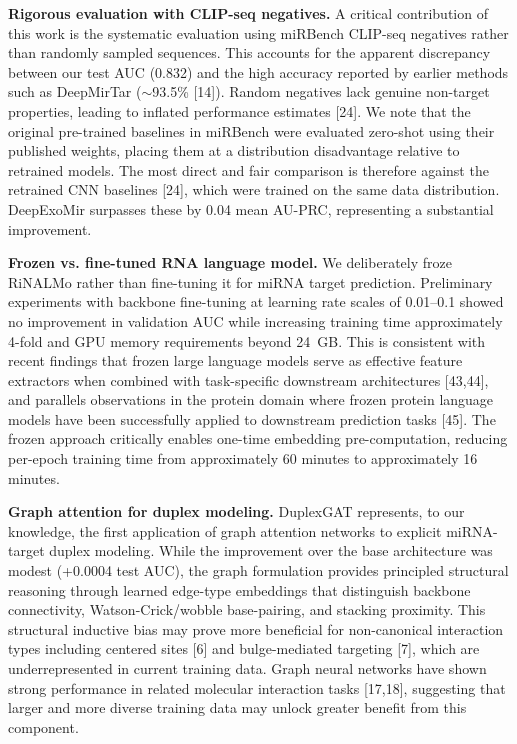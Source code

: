 \documentclass[sn-mathphys-num]{sn-jnl}
\begin{document}
\textbf{Rigorous evaluation with CLIP-seq negatives.} A critical contribution of this work is the systematic evaluation using miRBench CLIP-seq negatives rather than randomly sampled sequences. This accounts for the apparent discrepancy between our test AUC (0.832) and the high accuracy reported by earlier methods such as DeepMirTar ($\sim$93.5\% [14]). Random negatives lack genuine non-target properties, leading to inflated performance estimates [24]. We note that the original pre-trained baselines in miRBench were evaluated zero-shot using their published weights, placing them at a distribution disadvantage relative to retrained models. The most direct and fair comparison is therefore against the retrained CNN baselines [24], which were trained on the same data distribution. DeepExoMir surpasses these by 0.04 mean AU-PRC, representing a substantial improvement.

\textbf{Frozen vs. fine-tuned RNA language model.} We deliberately froze RiNALMo rather than fine-tuning it for miRNA target prediction. Preliminary experiments with backbone fine-tuning at learning rate scales of 0.01--0.1 showed no improvement in validation AUC while increasing training time approximately 4-fold and GPU memory requirements beyond 24~GB. This is consistent with recent findings that frozen large language models serve as effective feature extractors when combined with task-specific downstream architectures [43,44], and parallels observations in the protein domain where frozen protein language models have been successfully applied to downstream prediction tasks [45]. The frozen approach critically enables one-time embedding pre-computation, reducing per-epoch training time from approximately 60 minutes to approximately 16 minutes.

\textbf{Graph attention for duplex modeling.} DuplexGAT represents, to our knowledge, the first application of graph attention networks to explicit miRNA-target duplex modeling. While the improvement over the base architecture was modest (+0.0004 test AUC), the graph formulation provides principled structural reasoning through learned edge-type embeddings that distinguish backbone connectivity, Watson-Crick/wobble base-pairing, and stacking proximity. This structural inductive bias may prove more beneficial for non-canonical interaction types including centered sites [6] and bulge-mediated targeting [7], which are underrepresented in current training data. Graph neural networks have shown strong performance in related molecular interaction tasks [17,18], suggesting that larger and more diverse training data may unlock greater benefit from this component.
\end{document}
